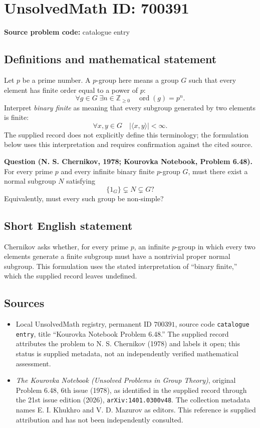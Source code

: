 \documentclass[11pt]{article}
\newcommand{\Z}{\mathbb{Z}}
\begin{document}
\section*{UnsolvedMath ID: 700391}
\textbf{Source problem code:} catalogue entry
\subsection{Definitions and mathematical statement}
Let \(p\) be a prime number. A \(p\)-group here means a group \(G\) such that every element has finite order equal to a power of \(p\):
\[
\forall g\in G\;\exists n\in\Z_{\geq 0}\quad \operatorname{ord}(g)=p^n.
\]
Interpret \emph{binary finite} as meaning that every subgroup generated by two elements is finite:
\[
\forall x,y\in G\quad |\langle x,y\rangle|<\infty.
\]
The supplied record does not explicitly define this terminology; the formulation below uses this interpretation and requires confirmation against the cited source.

\textbf{Question (N. S. Chernikov, 1978; Kourovka Notebook, Problem 6.48).} For every prime \(p\) and every infinite binary finite \(p\)-group \(G\), must there exist a normal subgroup \(N\) satisfying
\[
\{1_G\}\subsetneq N\subsetneq G?
\]
Equivalently, must every such group be non-simple?
\subsection{Short English statement}
Chernikov asks whether, for every prime \(p\), an infinite \(p\)-group in which every two elements generate a finite subgroup must have a nontrivial proper normal subgroup. This formulation uses the stated interpretation of ``binary finite,'' which the supplied record leaves undefined.
\subsection{Sources}
\begin{itemize}
\item Local UnsolvedMath registry, permanent ID \(700391\), source code \texttt{catalogue entry}, title ``Kourovka Notebook Problem 6.48.'' The supplied record attributes the problem to N. S. Chernikov (1978) and labels it open; this status is supplied metadata, not an independently verified mathematical assessment.
\item \emph{The Kourovka Notebook (Unsolved Problems in Group Theory)}, original Problem 6.48, 6th issue (1978), as identified in the supplied record through the 21st issue edition (2026), \texttt{arXiv:1401.0300v48}. The collection metadata names E. I. Khukhro and V. D. Mazurov as editors. This reference is supplied attribution and has not been independently consulted.
\end{itemize}
\end{document}
